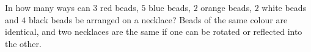 In how many ways can $3$ red beads, $5$ blue beads, $2$ orange beads, $2$ white beads and $4$ black beads be arranged on a necklace? Beads of the same colour are identical, and two necklaces are the same if one can be rotated or reflected into the other.
